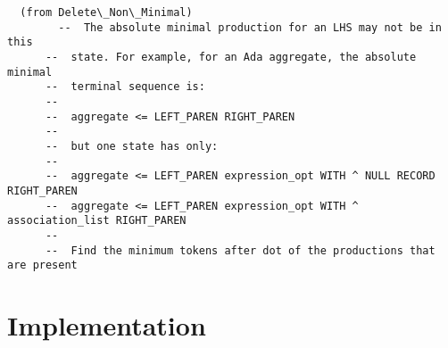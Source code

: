\documentclass{article}
\begin{document}
\begin{verbatim}
  (from Delete\_Non\_Minimal)
        --  The absolute minimal production for an LHS may not be in this
      --  state. For example, for an Ada aggregate, the absolute minimal
      --  terminal sequence is:
      --
      --  aggregate <= LEFT_PAREN RIGHT_PAREN
      --
      --  but one state has only:
      --
      --  aggregate <= LEFT_PAREN expression_opt WITH ^ NULL RECORD RIGHT_PAREN
      --  aggregate <= LEFT_PAREN expression_opt WITH ^ association_list RIGHT_PAREN
      --
      --  Find the minimum tokens after dot of the productions that are present

\end{verbatim}

\section{Implementation}
\end{document}
